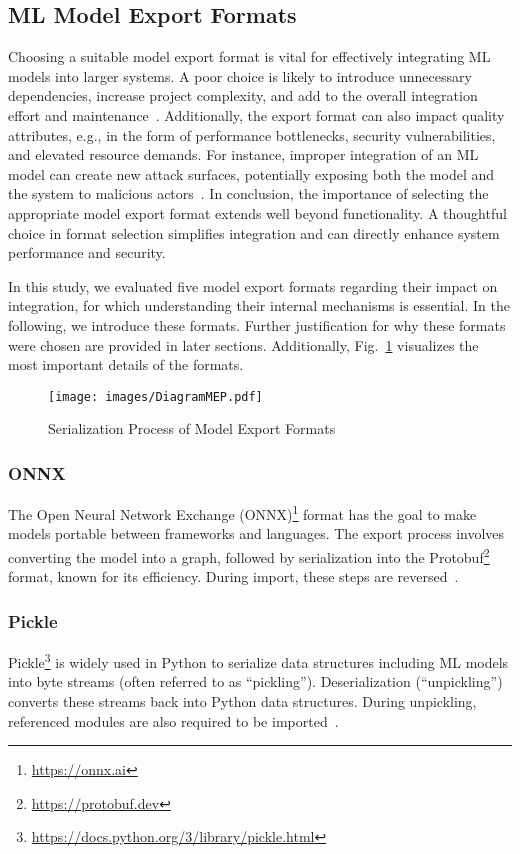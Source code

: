 \subsection{ML Model Export Formats}
Choosing a suitable model export format is vital for effectively integrating ML models into larger systems.
A poor choice is likely to introduce unnecessary dependencies, increase project complexity, and add to the overall integration effort and maintenance~\cite{Sens2024, Jajal2024}.
Additionally, the export format can also impact quality attributes, e.g., in the form of performance bottlenecks, security vulnerabilities, and elevated resource demands.
For instance, improper integration of an ML model can create new attack surfaces, potentially exposing both the model and the system to malicious actors~\cite{lewis2021mismatch, ozkaya2021architecture}.
In conclusion, the importance of selecting the appropriate model export format extends well beyond functionality.
A thoughtful choice in format selection simplifies integration and can directly enhance system performance and security.

In this study, we evaluated five model export formats regarding their impact on integration, for which understanding their internal mechanisms is essential.
In the following, we introduce these formats. Further justification for why these formats were chosen are provided in later sections.
Additionally, Fig.~\ref{fig:export-formats} visualizes the most important details of the formats.

\begin{figure}
    \centering
    \texttt{[image: images/DiagramMEP.pdf]}
    \caption{Serialization Process of Model Export Formats}
    \label{fig:export-formats}
\end{figure}

\subsubsection{ONNX}
The Open Neural Network Exchange (ONNX)\footnote{\url{https://onnx.ai}} format has the goal to make models portable between frameworks and languages.
The export process involves converting the model into a graph, followed by serialization into the Protobuf\footnote{\url{https://protobuf.dev}} format, known for its efficiency.
During import, these steps are reversed~\cite{klingler2023onnx, rai2023onnx}.

\subsubsection{Pickle}
Pickle\footnote{\url{https://docs.python.org/3/library/pickle.html}} is widely used in Python to serialize data structures including ML models into byte streams (often referred to as \enquote{pickling}).
Deserialization (\enquote{unpickling}) converts these streams back into Python data structures.
During unpickling, referenced modules are also required to be imported~\cite{agrawal2024pickling, selvaraj2018pickle}.

